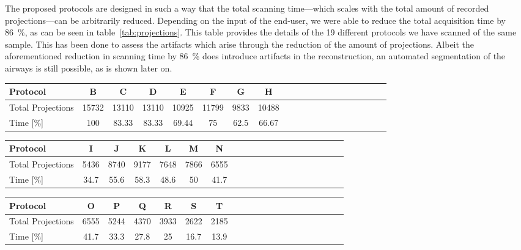 \begin{figure*}
	\centering
	\caption[Quality-Plot of 34 calculated protocols]{Quality-Plot of 34 calculated protocols. The red dots show the expected quality of the different protocols, the black plot is a polynomial fit $p(x)$ with $n=4$ for $p(x)=p_{1}x^{n}+p_{2}x^{n-1}+\cdots+p_{n}x+p_{n+1}$. A subset of 19 protocols have been scanned. Details of these scans are shown in table~\ref{tab:projections} and are discussed in section~\ref{sec:Results}.}%
	\label{fig:2008c-qualityplot}%
\end{figure*}

The proposed protocols are designed in such a way that the total scanning time---which scales with the total amount of recorded projections---can be arbitrarily reduced. Depending on the input of the end-user, we were able to reduce the total acquisition time by \SI{86}{\percent}, as can be seen in table~\ref{tab:projections}. This table provides the details of the 19 different protocols we have scanned of the same sample. This has been done to assess the artifacts which arise through the reduction of the amount of projections. Albeit the aforementioned reduction in scanning time by \SI{86}{\percent} does introduce artifacts in the reconstruction, an automated segmentation of the airways is still possible, as is shown later on.

\begin{table*}
	\centering
	\caption{Specification of different protocols and time used compared to gold standard}
	\begin{tabular*}{\textwidth}{l@{\extracolsep\fill}ccccccccccccccccccc}
		\toprule
		Protocol 			& B & C & D & E & F & G & H\\
		\midrule
		Total Projections 	& 15732 & 13110 & 13110 & 10925 & 11799 & 9833 & 10488\\
		Time [\%] 			& 100 & 83.33 & 83.33 & 69.44 & 75 & 62.5 & 66.67\\
		\bottomrule
	\end{tabular*}
	\begin{tabular*}{\textwidth}{l@{\extracolsep\fill}ccccccccccccccccccc}
		\toprule
		Protocol 			& I & J & K & L & M & N \\
		\midrule
		Total Projections 	& 5436 & 8740 & 9177 & 7648 & 7866 & 6555 \\
		Time [\%] 			& 34.7 & 55.6 & 58.3 & 48.6 & 50 & 41.7 \\
 		\bottomrule
	\end{tabular*}
	\begin{tabular*}{\textwidth}{l@{\extracolsep\fill}ccccccccccccccccccc}
		\toprule
		Protocol 			& O & P & Q & R & S & T \\
		\midrule
		Total Projections 	& 6555 & 5244 & 4370 & 3933 & 2622 & 2185 \\
		Time [\%] 			& 41.7 & 33.3 & 27.8 & 25 & 16.7 & 13.9 \\
		\bottomrule
	\end{tabular*}
	\label{tab:projections}
\end{table*}

